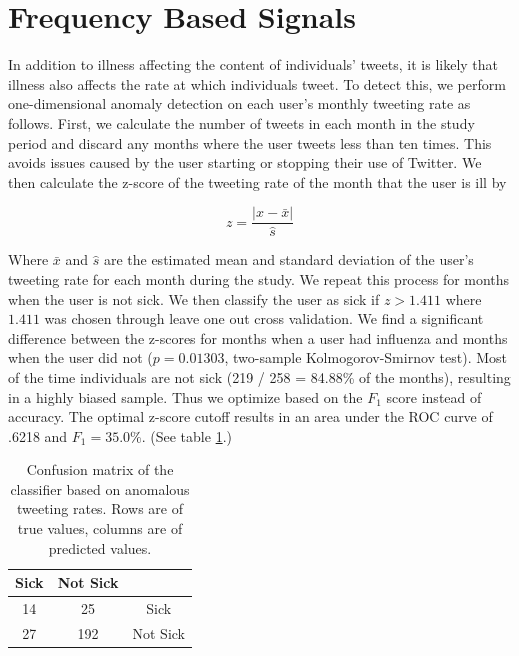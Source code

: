 \documentclass{acm_proc_article-sp}
\begin{document}
\section{Frequency Based Signals}

In addition to illness affecting the content of individuals' tweets, it is likely that illness also affects the rate at which individuals tweet. To detect this, we perform one-dimensional anomaly detection on each user's monthly tweeting rate as follows. First, we calculate the number of tweets in each month in the study period and discard any months where the user tweets less than ten times. This avoids issues caused by the user starting or stopping their use of Twitter. We then calculate the z-score of the tweeting rate of the month that the user is ill by

\begin{equation}
z = \frac{|x - \bar{x}|}{\hat{s}}
\end{equation}

Where \(\bar{x}\) and \(\hat{s}\) are the estimated mean and standard deviation of the user's tweeting rate for each month during the study. \cite{Grubs:1969ab} We repeat this process for months when the user is not sick. We then classify the user as sick if \(z > 1.411\) where \(1.411\) was chosen through leave one out cross validation. We find a significant difference between the z-scores for months when a user had influenza and months when the user did not (\(p = 0.01303\), two-sample Kolmogorov-Smirnov test). Most of the time individuals are not sick (219 / 258 = 84.88\% of the months), resulting in a highly biased sample. Thus we optimize based on the \(F_1\) score instead of accuracy. The optimal z-score cutoff results in  an area under the ROC curve of .6218 and \(F_1= 35.0\%\). (See table \ref{tab:tweet_anomaly_confusion}.) 


\begin{table}
\centering
\begin{tabular}{|c|c|c|} \hline
Sick&Not Sick&\ \\ \hline
14 & 25 & Sick\\ \hline
27 & 192 & Not Sick\\
\hline\end{tabular}
\caption{Confusion matrix of the classifier based on anomalous tweeting rates. Rows are of true values, columns are of predicted values.}
\label{tab:tweet_anomaly_confusion}
\end{table}
\end{document}
